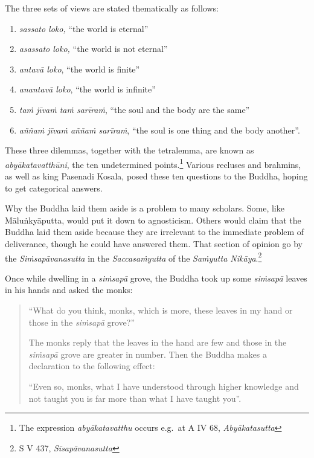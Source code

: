 The three sets of views are stated thematically as follows:

\begin{enumerate}
\def\labelenumi{\arabic{enumi}.}
\tightlist
\item
  \emph{sassato loko,} ``the world is eternal''
\item
  \emph{asassato loko,} ``the world is not eternal''
\item
  \emph{antavā loko}, ``the world is finite''
\item
  \emph{anantavā loko}, ``the world is infinite''
\item
  \emph{taṁ jīvaṁ taṁ sarīraṁ}, ``the soul and the body are the same''
\item
  \emph{aññaṁ jīvaṁ aññaṁ sarīraṁ}, ``the soul is one thing and the body another''.
\end{enumerate}

These three dilemmas, together with the tetralemma, are known as \emph{abyākatavatthūni}, the ten undetermined points.\footnote{The expression \emph{abyākatavatthu} occurs e.g.~at A IV 68, \emph{Abyākatasutta}} Various recluses and brahmins, as well as king Pasenadi Kosala, posed these ten questions to the Buddha, hoping to get categorical answers.

Why the Buddha laid them aside is a problem to many scholars. Some, like Māluṅkyāputta, would put it down to agnosticism. Others would claim that the Buddha laid them aside because they are irrelevant to the immediate problem of deliverance, though he could have answered them. That section of opinion go by the \emph{Siṁsapāvanasutta} in the \emph{Saccasaṁyutta} of the \emph{Saṁyutta Nikāya}.\footnote{S V 437, \emph{Sīsapāvanasutta}}

Once while dwelling in a \emph{siṁsapā} grove, the Buddha took up some \emph{siṁsapā} leaves in his hands and asked the monks:

\begin{quote}
``What do you think, monks, which is more, these leaves in my hand or those in the \emph{siṁsapā} grove?''

The monks reply that the leaves in the hand are few and those in the \emph{siṁsapā} grove are greater in number. Then the Buddha makes a declaration to the following effect:

``Even so, monks, what I have understood through higher knowledge and not taught you is far more than what I have taught you''.
\end{quote}

